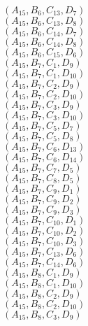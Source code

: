 \documentclass[14pt]{article}
\begin{document}
    $({A}_{15}, {B}_{6}, {C}_{13}, {D}_{7}) $ \\ 
    $({A}_{15}, {B}_{6}, {C}_{13}, {D}_{8}) $ \\ 
    $({A}_{15}, {B}_{6}, {C}_{14}, {D}_{7}) $ \\ 
    $({A}_{15}, {B}_{6}, {C}_{14}, {D}_{8}) $ \\ 
    $({A}_{15}, {B}_{6}, {C}_{15}, {D}_{6}) $ \\ 
    $({A}_{15}, {B}_{7}, {C}_{1}, {D}_{9}) $ \\ 
    $({A}_{15}, {B}_{7}, {C}_{1}, {D}_{10}) $ \\ 
    $({A}_{15}, {B}_{7}, {C}_{2}, {D}_{9}) $ \\ 
    $({A}_{15}, {B}_{7}, {C}_{2}, {D}_{10}) $ \\ 
    $({A}_{15}, {B}_{7}, {C}_{3}, {D}_{9}) $ \\ 
    $({A}_{15}, {B}_{7}, {C}_{3}, {D}_{10}) $ \\ 
    $({A}_{15}, {B}_{7}, {C}_{5}, {D}_{7}) $ \\ 
    $({A}_{15}, {B}_{7}, {C}_{5}, {D}_{8}) $ \\ 
    $({A}_{15}, {B}_{7}, {C}_{6}, {D}_{13}) $ \\ 
    $({A}_{15}, {B}_{7}, {C}_{6}, {D}_{14}) $ \\ 
    $({A}_{15}, {B}_{7}, {C}_{7}, {D}_{5}) $ \\ 
    $({A}_{15}, {B}_{7}, {C}_{8}, {D}_{5}) $ \\ 
    $({A}_{15}, {B}_{7}, {C}_{9}, {D}_{1}) $ \\ 
    $({A}_{15}, {B}_{7}, {C}_{9}, {D}_{2}) $ \\ 
    $({A}_{15}, {B}_{7}, {C}_{9}, {D}_{3}) $ \\ 
    $({A}_{15}, {B}_{7}, {C}_{10}, {D}_{1}) $ \\ 
    $({A}_{15}, {B}_{7}, {C}_{10}, {D}_{2}) $ \\ 
    $({A}_{15}, {B}_{7}, {C}_{10}, {D}_{3}) $ \\ 
    $({A}_{15}, {B}_{7}, {C}_{13}, {D}_{6}) $ \\ 
    $({A}_{15}, {B}_{7}, {C}_{14}, {D}_{6}) $ \\ 
    $({A}_{15}, {B}_{8}, {C}_{1}, {D}_{9}) $ \\ 
    $({A}_{15}, {B}_{8}, {C}_{1}, {D}_{10}) $ \\ 
    $({A}_{15}, {B}_{8}, {C}_{2}, {D}_{9}) $ \\ 
    $({A}_{15}, {B}_{8}, {C}_{2}, {D}_{10}) $ \\ 
    $({A}_{15}, {B}_{8}, {C}_{3}, {D}_{9}) $ \\ 
\end{document}
